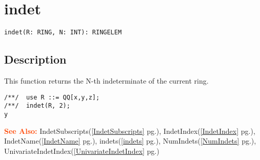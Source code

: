 \documentclass[a4paper]{mybook}
\newenvironment{command}{}{} %
\newcommand\SeeAlso{\par\textcolor{OrangeRed}{\textbf{\large See Also: }}}
\begin{document}
\section{indet}
\label{indet}
\begin{command} %


\begin{Verbatim}[label=syntax, rulecolor=\color{MidnightBlue},
frame=single]
indet(R: RING, N: INT): RINGELEM
\end{Verbatim}


\subsection*{Description}

This function returns the N-th indeterminate of the current ring.
\begin{Verbatim}[label=example, rulecolor=\color{PineGreen}, frame=single]
/**/  use R ::= QQ[x,y,z];
/**/  indet(R, 2);
y
\end{Verbatim}


\SeeAlso %
  IndetSubscripts(\ref{IndetSubscripts} pg.\pageref{IndetSubscripts}), 
    IndetIndex(\ref{IndetIndex} pg.\pageref{IndetIndex}), 
    IndetName(\ref{IndetName} pg.\pageref{IndetName}), 
    indets(\ref{indets} pg.\pageref{indets}), 
    NumIndets(\ref{NumIndets} pg.\pageref{NumIndets}), 
    UnivariateIndetIndex(\ref{UnivariateIndetIndex} pg.\pageref{UnivariateIndetIndex})
\end{command} %
\end{document}
